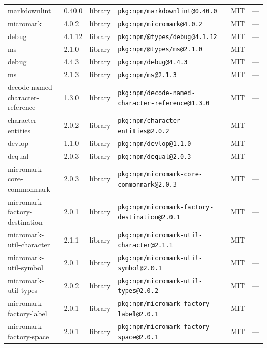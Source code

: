 \documentclass[11pt,a4paper]{article}
\begin{document}
\begin{longtable}{|p{4cm}|p{2cm}|p{1.6cm}|p{5cm}|p{1.5cm}|p{3.5cm}|}
\raggedright markdownlint & 0.40.0 & library & \small\texttt{pkg:npm/markdownlint@0.40.0} & MIT & \small — \\
\raggedright micromark & 4.0.2 & library & \small\texttt{pkg:npm/micromark@4.0.2} & MIT & \small — \\
\raggedright debug & 4.1.12 & library & \small\texttt{pkg:npm/@types/debug@4.1.12} & MIT & \small — \\
\raggedright ms & 2.1.0 & library & \small\texttt{pkg:npm/@types/ms@2.1.0} & MIT & \small — \\
\raggedright debug & 4.4.3 & library & \small\texttt{pkg:npm/debug@4.4.3} & MIT & \small — \\
\raggedright ms & 2.1.3 & library & \small\texttt{pkg:npm/ms@2.1.3} & MIT & \small — \\
\raggedright decode-named-character-reference & 1.3.0 & library & \small\texttt{pkg:npm/decode-named-character-reference@1.3.0} & MIT & \small — \\
\raggedright character-entities & 2.0.2 & library & \small\texttt{pkg:npm/character-entities@2.0.2} & MIT & \small — \\
\raggedright devlop & 1.1.0 & library & \small\texttt{pkg:npm/devlop@1.1.0} & MIT & \small — \\
\raggedright dequal & 2.0.3 & library & \small\texttt{pkg:npm/dequal@2.0.3} & MIT & \small — \\
\raggedright micromark-core-commonmark & 2.0.3 & library & \small\texttt{pkg:npm/micromark-core-commonmark@2.0.3} & MIT & \small — \\
\raggedright micromark-factory-destination & 2.0.1 & library & \small\texttt{pkg:npm/micromark-factory-destination@2.0.1} & MIT & \small — \\
\raggedright micromark-util-character & 2.1.1 & library & \small\texttt{pkg:npm/micromark-util-character@2.1.1} & MIT & \small — \\
\raggedright micromark-util-symbol & 2.0.1 & library & \small\texttt{pkg:npm/micromark-util-symbol@2.0.1} & MIT & \small — \\
\raggedright micromark-util-types & 2.0.2 & library & \small\texttt{pkg:npm/micromark-util-types@2.0.2} & MIT & \small — \\
\raggedright micromark-factory-label & 2.0.1 & library & \small\texttt{pkg:npm/micromark-factory-label@2.0.1} & MIT & \small — \\
\raggedright micromark-factory-space & 2.0.1 & library & \small\texttt{pkg:npm/micromark-factory-space@2.0.1} & MIT & \small — \\

\end{longtable}
\end{document}
